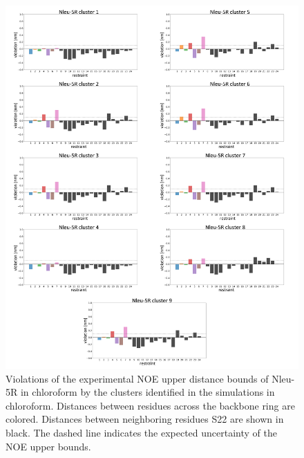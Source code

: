 \begin{figure}[h!]
    \centering
    \includegraphics[width=\textwidth]{7_chapter_5/fig/results/NMR_5R.png}
    \caption{Violations  of  the  experimental  NOE  upper  distance  bounds  of  Nleu-5R  in chloroform by the clusters identified in the simulations in chloroform. Distances between residues across the backbone ring are colored. Distances between neighboring residues S22 are shown in black. The dashed line indicates the expected uncertainty of the NOE upper bounds.}
    \label{fig: SINOE violations Nleu-5R}
\end{figure}

